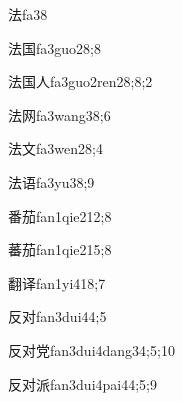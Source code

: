 \begin{verbete}{法}{fa3}{8}
\end{verbete}

\begin{verbete}{法国}{fa3guo2}{8;8}
\end{verbete}

\begin{verbete}{法国人}{fa3guo2ren2}{8;8;2}
\end{verbete}

\begin{verbete}{法网}{fa3wang3}{8;6}
\end{verbete}

\begin{verbete}{法文}{fa3wen2}{8;4}
\end{verbete}

\begin{verbete}{法语}{fa3yu3}{8;9}
\end{verbete}

\begin{verbete}{番茄}{fan1qie2}{12;8}
\end{verbete}

\begin{verbete}{蕃茄}{fan1qie2}{15;8}
\end{verbete}

\begin{verbete}{翻译}{fan1yi4}{18;7}
\end{verbete}

\begin{verbete}{反对}{fan3dui4}{4;5}
\end{verbete}

\begin{verbete}{反对党}{fan3dui4dang3}{4;5;10}
\end{verbete}

\begin{verbete}{反对派}{fan3dui4pai4}{4;5;9}
\end{verbete}

